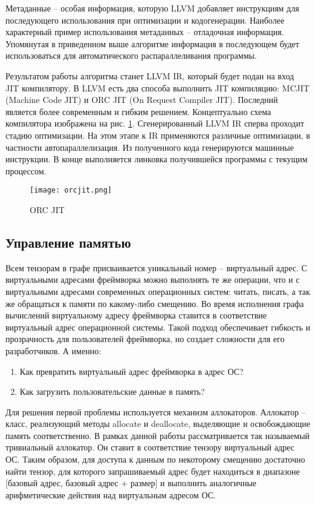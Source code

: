 Метаданные -- особая информация, которую LLVM добавляет инструкциям для
последующего использования при оптимизации и кодогенерации. Наиболее характерный
пример использования метаданных -- отладочная информация. Упомянутая в приведенном
выше алгоритме информация в последующем будет использоваться для автоматического
распараллеливания программы.

Результатом работы алгоритма станет LLVM IR, который будет подан на вход
JIT компилятору. В LLVM есть два способа выполнить JIT компиляцию: MCJIT
(Machine Code JIT) и ORC JIT (On Request Compiler JIT). Последний является
более современным и гибким решением. Концептуально схема компилятора
изображена на рис. \ref{fig:orcjit}. Сгенерированный LLVM IR сперва проходит
стадию оптимизации. На этом этапе к IR применяются различные оптимизации, в
частности автопараллелизация. Из полученного кода генерируются машинные инструкции.
В конце выполняется линковка получившейся программы с текущим процессом.

\begin{figure}[ht]
    \centering
    \texttt{[image: orcjit.png]}
    \caption{ORC JIT}
    \label{fig:orcjit}
\end{figure}
\subsection{Управление памятью}

Всем тензорам в графе присваивается уникальный номер -- виртуальный адрес.
С виртуальными адресами фреймворка можно выполнять те же операции, что и с
виртуальными адресами современных операционных систем: читать, писать, а так
же обращаться к памяти по какому-либо смещению. Во время исполнения графа
вычислений виртуальному адресу фреймворка ставится в соответствие виртуальный
адрес операционной системы. Такой подход обеспечивает гибкость и прозрачность
для пользователей фреймворка, но создает сложности для его разработчиков.
А именно:
\begin{enumerate}
    \item Как превратить виртуальный адрес фреймворка в адрес ОС?
    \item Как загрузить пользовательские данные в память?
\end{enumerate}

Для решения первой проблемы используется механизм аллокаторов. Аллокатор --
класс, реализующий методы allocate и deallocate, выделяющие и освобождающие
память соответственно. В рамках данной работы рассматривается так называемый
тривиальный аллокатор. Он ставит в соответствие тензору виртуальный адрес ОС.
Таким образом, для доступа к данным по некоторому смещению достаточно найти
тензор, для которого запрашиваемый адрес будет находиться в диапазоне [базовый адрес, базовый адрес + размер]
и выполнить аналогичные арифметические действия над виртуальным адресом ОС.

